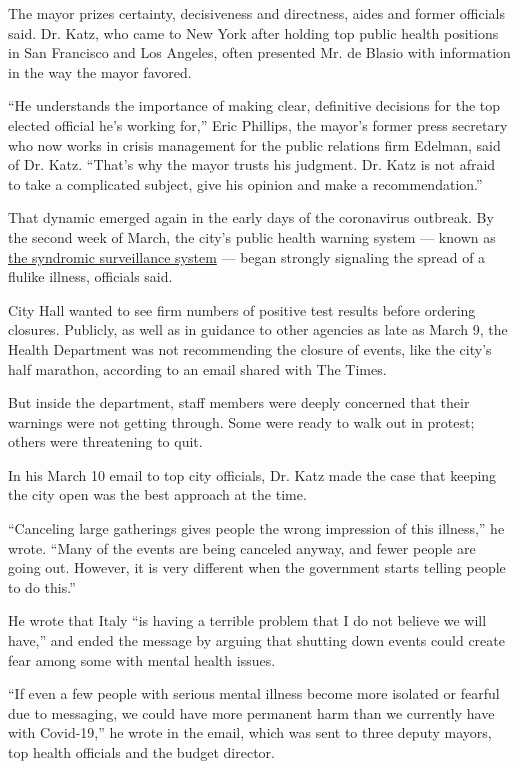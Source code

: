 The mayor prizes certainty, decisiveness and directness, aides and
former officials said. Dr. Katz, who came to New York after holding top
public health positions in San Francisco and Los Angeles, often
presented Mr. de Blasio with information in the way the mayor favored.

``He understands the importance of making clear, definitive decisions
for the top elected official he's working for,'' Eric Phillips, the
mayor's former press secretary who now works in crisis management for
the public relations firm Edelman, said of Dr. Katz. ``That's why the
mayor trusts his judgment. Dr. Katz is not afraid to take a complicated
subject, give his opinion and make a recommendation.''

That dynamic emerged again in the early days of the coronavirus
outbreak. By the second week of March, the city's public health warning
system --- known as
\href{https://a816-health.nyc.gov/hdi/epiquery/visualizations?PageType=ps\&PopulationSource=Syndromic}{the
syndromic surveillance system} --- began strongly signaling the spread
of a flulike illness, officials said.

City Hall wanted to see firm numbers of positive test results before
ordering closures. Publicly, as well as in guidance to other agencies as
late as March 9, the Health Department was not recommending the closure
of events, like the city's half marathon, according to an email shared
with The Times.

But inside the department, staff members were deeply concerned that
their warnings were not getting through. Some were ready to walk out in
protest; others were threatening to quit.

In his March 10 email to top city officials, Dr. Katz made the case that
keeping the city open was the best approach at the time.

``Canceling large gatherings gives people the wrong impression of this
illness,'' he wrote. ``Many of the events are being canceled anyway, and
fewer people are going out. However, it is very different when the
government starts telling people to do this.''

He wrote that Italy ``is having a terrible problem that I do not believe
we will have,'' and ended the message by arguing that shutting down
events could create fear among some with mental health issues.

``If even a few people with serious mental illness become more isolated
or fearful due to messaging, we could have more permanent harm than we
currently have with Covid-19,'' he wrote in the email, which was sent to
three deputy mayors, top health officials and the budget director.

